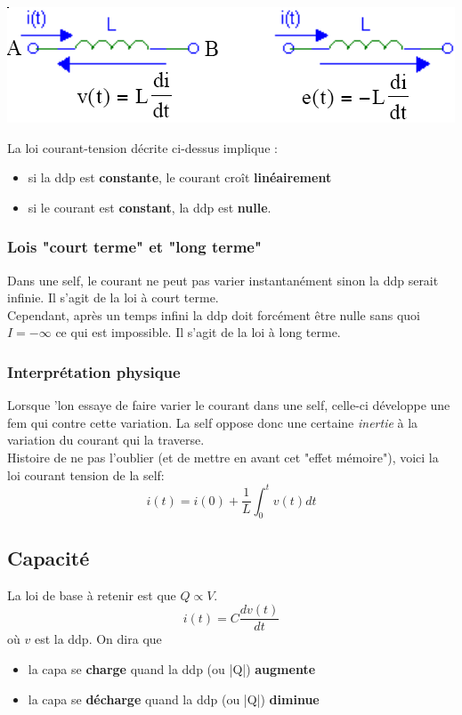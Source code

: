 \documentclass	[11pt, a4paper, openany]{book}
\begin{document}
\begin{center}
\includegraphics[scale=0.5]{img/image10.png}
\end{center}

La loi courant-tension décrite ci-dessus implique :
\begin{itemize}
\item si la ddp est \textbf{constante}, le courant croît \textbf{linéairement}
\item si le courant est \textbf{constant}, la ddp est \textbf{nulle}.
\end{itemize}


\subsubsection{Lois "court terme" et "long terme"}
Dans une self, le courant ne peut pas varier instantanément sinon la ddp serait infinie. Il s'agit de la loi à court terme.\\
Cependant, après un temps infini la ddp doit forcément être nulle sans quoi $I = - \infty$ ce qui est impossible. Il s'agit de la loi à long terme.

\subsubsection{Interprétation physique}
Lorsque 'lon essaye de faire varier le courant dans une self, celle-ci développe une fem qui contre cette variation. La self oppose donc une certaine \textit{inertie} à la variation du courant qui la traverse.\\

Histoire de ne pas l'oublier (et de mettre en avant cet "effet mémoire"), voici la loi courant tension de la self:
\begin{equation}
i(t) = i(0) + \frac{1}{L}\int_0^t v(t) dt
\end{equation}


\subsection{Capacité}
La loi de base à retenir est que $Q \propto V$.
\begin{equation}
i(t) = C \frac{dv(t)}{dt}
\end{equation}
où $v$ est la ddp. On dira que
\begin{itemize}
\item la capa se \textbf{charge} quand la ddp (ou |Q|) \textbf{augmente}
\item la capa se \textbf{décharge} quand la ddp (ou |Q|) \textbf{diminue}
\end{itemize}
\end{document}

